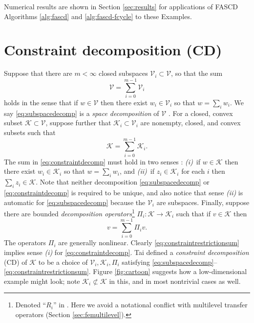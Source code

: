 \documentclass[letterpaper,final,12pt,reqno]{amsart}
\theoremstyle{cstyle}
\theoremstyle{cstyle*}
\theoremstyle{dstyle}
\numberwithin{equation}{section}
\numberwithin{figure}{section}
\numberwithin{table}{section}
\numberwithin{theorem}{section}
\newcommand{\cK}{\mathcal{K}}
\newcommand{\cV}{\mathcal{V}}
\begin{document}
Numerical results are shown in Section \ref{sec:results} for applications of FASCD Algorithms \ref{alg:fascd} and \ref{alg:fascd-fcycle} to these Examples.


\section{Constraint decomposition (CD)} \label{sec:cd}

Suppose that there are $m<\infty$ closed subspaces $\cV_i \subset \cV$, so that the sum
\begin{equation}
\cV = \sum_{i=0}^{m-1} \cV_i \label{eq:subspacedecomp}
\end{equation}
holds in the sense that if $w \in \cV$ then there exist $w_i \in \cV_i$ so that $w = \sum_i w_i$.  We say \eqref{eq:subspacedecomp} is a \emph{space decomposition} of $\cV$ \cite{Xu1992}.  For a closed, convex subset $\cK \subset \cV$, suppose further that $\cK_i \subset \cV_i$ are nonempty, closed, and convex subsets such that
\begin{equation}
\cK = \sum_{i=0}^{m-1} \cK_i. \label{eq:constraintdecomp}
\end{equation}
The sum in \eqref{eq:constraintdecomp} must hold in two senses \cite{TaiTseng2002}: \emph{(i)}~if $w \in \cK$ then there exist $w_i \in \cK_i$ so that $w = \sum_i w_i$, and \emph{(ii)}~if $z_i \in \cK_i$ for each $i$ then $\sum_i z_i \in \cK$.  Note that neither decomposition \eqref{eq:subspacedecomp} or \eqref{eq:constraintdecomp} is required to be unique, and also notice that sense \emph{(ii)} is automatic for \eqref{eq:subspacedecomp} because the $\cV_i$ are subspaces.  Finally, suppose there are bounded \emph{decomposition operators}\footnote{Denoted ``$R_i$'' in \cite{Tai2003}.  Here we avoid a notational conflict with multilevel transfer operators (Section \ref{sec:femultilevel}).} $\Pi_i : \cK \to \cK_i$ such that if $v \in \cK$ then
\begin{equation}
v = \sum_{i=0}^{m-1} \Pi_i v.  \label{eq:constraintrestrictionsum}
\end{equation}
The operators $\Pi_i$ are generally nonlinear.  Clearly \eqref{eq:constraintrestrictionsum} implies sense \emph{(i)} for \eqref{eq:constraintdecomp}. Tai \cite{Tai2003} defined a \emph{constraint decomposition} (CD) of $\cK$ to be a choice of $\cV_i,\cK_i,\Pi_i$ satisfying \eqref{eq:subspacedecomp}--\eqref{eq:constraintrestrictionsum}.  Figure \ref{fig:cartoon} suggests how a low-dimensional example might look; note $\cK_i \not\subset \cK$ in this, and in most nontrivial cases as well.
\end{document}
